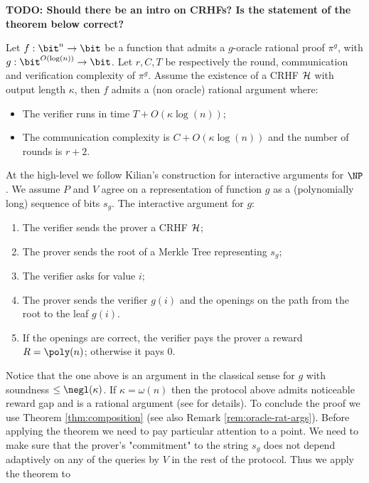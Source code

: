 \textbf{TODO: Should there be an intro on CRHFs? Is the statement of the theorem below correct?} 
\newcommand{\hf}{\cal H}
\begin{lemma}
	\label{lemma:crhf-merkle-ratargs}
	Let $f: \bit^n \to \bit$ be a function that admits a $g$-oracle rational proof $\pi^g$, with $g: \bit^{O(\log(n))} \to \bit$. Let $r,C,T$ be respectively the round, communication and verification complexity of $\pi^g$.
	Assume the existence of a CRHF $\hf$ with output length $\kappa$, then $f$ admits a (non oracle) rational argument where:
	\begin{itemize}
		\item The verifier runs in time $T + O(\kappa \log(n))$;
		\item The communication complexity is $C + O(\kappa \log(n))$ and the number of rounds is $r+2$. %
	\end{itemize}
\end{lemma}
\begin{proofsketch}
	At the high-level we follow Kilian's construction for interactive arguments for $\NP$ \cite{kilian1992note}.
	We assume $P$ and $V$ agree on a representation of function $g$ as a (polynomially long) sequence of bits $s_g$.
	The interactive argument for $g$:
	\begin{enumerate}
	\item The verifier sends the prover a CRHF $\hf$;
	\item The prover sends the root of a Merkle Tree representing $s_g$;
	\item The verifier asks for value $i$;
	\item The prover sends the verifier $g(i)$ and the openings on the path from the root to the leaf $g(i)$.
	\item If the openings are correct, the verifier pays the prover a reward $R = \poly(n)$; otherwise it pays $0$.
	\end{enumerate}
	
	Notice that the one above is an argument in the classical sense for $g$ with soundness $\leq \negl(\kappa)$. If $\kappa = \omega(n)$ then the protocol
	above admits noticeable reward gap and is a rational argument (see \cite{kilian1992note} for details). To conclude the proof we use Theorem \ref{thm:composition} (see also Remark \ref{rem:oracle-rat-args}). Before applying the theorem we need to pay particular attention to a point. We need to make sure that the prover's "commitment" to the string $s_g$ does not depend adaptively on any of the queries by $V$ in the rest of the protocol. Thus we apply the theorem to 
\end{proofsketch}

